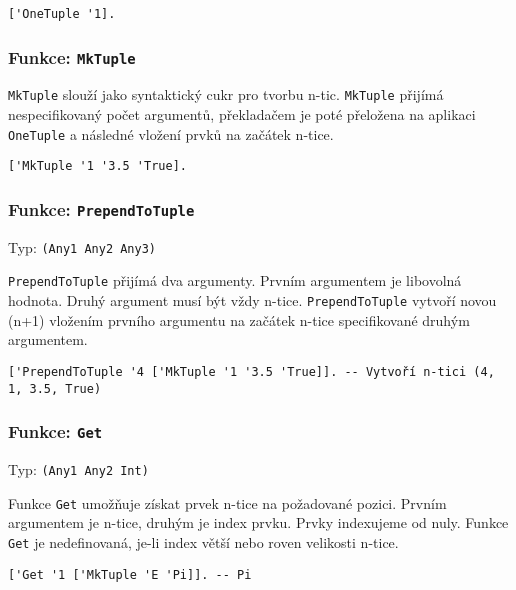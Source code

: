 \begin{lstlisting}[caption={Ukázka využití OneTuple}]
['OneTuple '1].
\end{lstlisting}

\subsubsection*{Funkce: \lstinline{MkTuple}}\label{mk-tuple-fn}

\lstinline{MkTuple} slouží jako syntaktický cukr pro tvorbu n-tic. \lstinline{MkTuple} přijímá
nespecifikovaný počet argumentů, překladačem je poté přeložena na aplikaci \lstinline{OneTuple}
a následné vložení prvků na začátek n-tice.

\begin{lstlisting}[caption={Ukázka využití OneTuple}]
['MkTuple '1 '3.5 'True].
\end{lstlisting}

\subsubsection*{Funkce: \lstinline{PrependToTuple}}
Typ: \lstinline{(Any1 Any2 Any3)}

\lstinline{PrependToTuple} přijímá dva argumenty. Prvním argumentem je libovolná hodnota. Druhý
argument musí být vždy n-tice. \lstinline{PrependToTuple} vytvoří novou (n+1) vložením prvního
argumentu na začátek n-tice specifikované druhým argumentem.

\begin{lstlisting}[caption={Ukázka využití PrependToTuple}]
['PrependToTuple '4 ['MkTuple '1 '3.5 'True]]. -- Vytvoří n-tici (4, 1, 3.5, True)
\end{lstlisting}

\subsubsection*{Funkce: \lstinline{Get}}
Typ: \lstinline{(Any1 Any2 Int)}

Funkce \lstinline{Get} umožňuje získat prvek n-tice na požadované pozici. Prvním argumentem je
n-tice, druhým je index prvku. Prvky indexujeme od nuly. Funkce \lstinline{Get} je nedefinovaná,
je-li index větší nebo roven velikosti n-tice.

\begin{lstlisting}[caption={Ukázka využití Get}]
['Get '1 ['MkTuple 'E 'Pi]]. -- Pi
\end{lstlisting}

